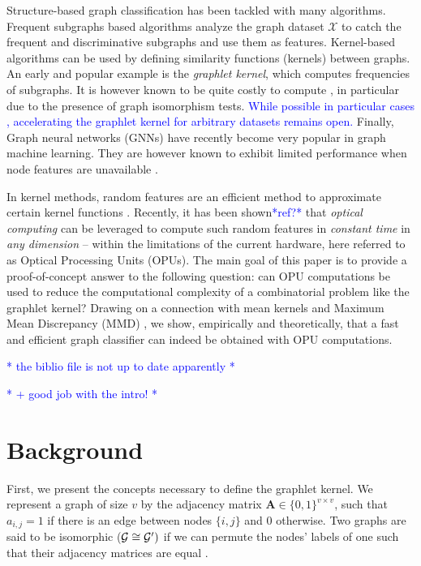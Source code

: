 \documentclass{article}
\newcommand\nt[1]{\textcolor{blue}{#1}}
\begin{document}
Structure-based graph classification has been tackled with many algorithms. Frequent subgraphs based algorithms \cite{frequent_subgraphs} analyze the graph dataset $\mathcal{X}$ to catch the frequent and discriminative subgraphs and use them as features. Kernel-based algorithms \cite{kriege_graph_kernels} can be used by defining similarity functions (kernels) between graphs. An early and popular example is the \emph{graphlet kernel}, which computes frequencies of subgraphs. It is however known to be quite costly to compute \cite{graphlet_kernel}, in particular due to the presence of graph isomorphism tests. \nt{While possible in particular cases \cite{Fast_graphlet}, accelerating the graphlet kernel for arbitrary datasets remains open.} 
Finally, Graph neural networks (GNNs) \cite{GNN_bruna, GNN_review} have recently become very popular in graph machine learning. They are however known to exhibit limited performance when node features are unavailable \cite{GNN_limits}. %

In kernel methods, random features are an efficient method to approximate certain kernel functions \cite{Rahimi, RF_1}. Recently, it has been shown\nt{*ref?*} that \emph{optical computing} can be leveraged to compute such random features in \emph{constant time} in \emph{any dimension} -- within the limitations of the current hardware, here referred to as Optical Processing Units (OPUs).
The main goal of this paper is to provide a proof-of-concept answer to the following question: can OPU computations be used to reduce the computational complexity of a combinatorial problem like the graphlet kernel? Drawing on a connection with mean kernels and Maximum Mean Discrepancy (MMD) \cite{gretton}, we show, empirically and theoretically, that a fast and efficient graph classifier can indeed be obtained with OPU computations.

\nt{* the biblio file is not up to date apparently *}

\nt{* + good job with the intro! *}

\section{Background}
\label{sec:background}
First, we present the concepts necessary to define the graphlet kernel. We represent a graph of size $v$ by the adjacency matrix $\mathbf{A}\in \{0,1\}^{v\times v}$, such that $a_{i,j} =1$ if there is an edge between nodes $\{i,j\}$ and $0$ otherwise. Two graphs are said to be isomorphic ($\mathcal{G}\cong \mathcal{G}')$ if we can permute the nodes' labels of one such that their adjacency matrices are equal \cite{isomorphism}. 
\end{document}
